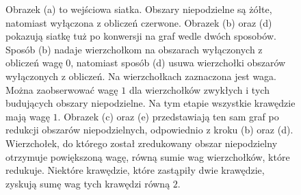 \begin{figure}[h]
\begin{subfigure}{.5\textwidth}
    \caption[short]{}
\end{subfigure}
\begin{subfigure}{.5\textwidth}
    \centering
    \caption[short]{}
\end{subfigure}%
\begin{subfigure}{.5\textwidth}
    \centering
    \caption[short]{}
\end{subfigure}
\caption{Obrazek (a) to wejściowa siatka.
Obszary niepodzielne są żółte, natomiast wyłączona z obliczeń czerwone.
Obrazek (b) oraz (d) pokazują siatkę tuż po konwersji na graf wedle dwóch sposobów.
Sposób (b) nadaje wierzchołkom na obszarach wyłączonych z obliczeń wagę $0$, natomiast sposób (d) usuwa wierzchołki obszarów
wyłączonych z obliczeń.
Na wierzchołkach zaznaczona jest waga.
Można zaobserwować wagę $1$ dla wierzchołków zwykłych i tych budujących obszary niepodzielne.
Na tym etapie wszystkie krawędzie mają wagę $1$. Obrazek (c) oraz (e) przedstawiają ten sam graf po redukcji obszarów
niepodzielnych, odpowiednio z kroku (b) oraz (d).
Wierzchołek, do którego został zredukowany obszar niepodzielny otrzymuje powiększoną wagę, równą sumie wag wierzchołków, które
redukuje. Niektóre krawędzie, które zastąpiły dwie krawędzie, zyskują sumę wag tych krawędzi równą $2$.}
\label{im:indivisible}
\end{figure}

\FloatBarrier


